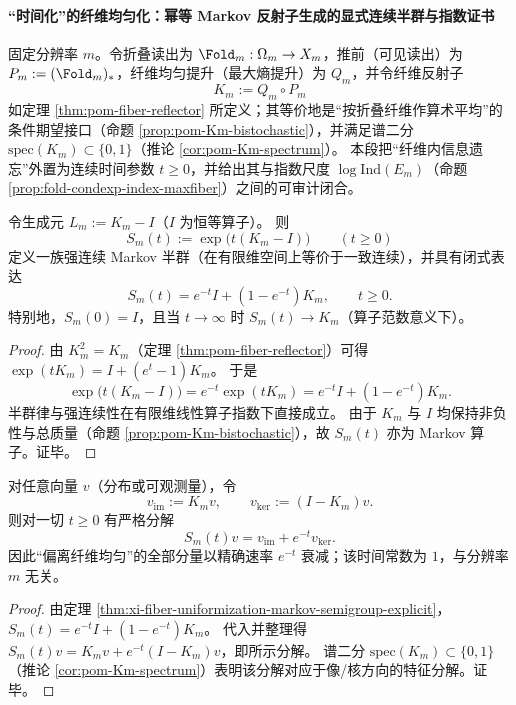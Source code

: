 \paragraph{“时间化”的纤维均匀化：幂等 Markov 反射子生成的显式连续半群与指数证书}
固定分辨率 \(m\)。令折叠读出为 \(\Fold_m:\Omega_m\to X_m\)，推前（可见读出）为 \(P_m:=(\Fold_m)_\ast\)，纤维均匀提升（最大熵提升）为 \(Q_m\)，并令纤维反射子
\[
K_m:=Q_m\circ P_m
\]
如定理 \ref{thm:pom-fiber-reflector} 所定义；其等价地是“按折叠纤维作算术平均”的条件期望接口（命题 \ref{prop:pom-Km-bistochastic}），并满足谱二分 \(\mathrm{spec}(K_m)\subset\{0,1\}\)（推论 \ref{cor:pom-Km-spectrum}）。
本段把“纤维内信息遗忘”外置为连续时间参数 \(t\ge 0\)，并给出其与指数尺度 \(\log\mathrm{Ind}(E_m)\)（命题 \ref{prop:fold-condexp-index-maxfiber}）之间的可审计闭合。
\par

\begin{theorem}[纤维均匀化的显式连续时间半群]\label{thm:xi-fiber-uniformization-markov-semigroup-explicit}
令生成元 \(L_m:=K_m-I\)（\(I\) 为恒等算子）。
则
\[
S_m(t):=\exp\!\bigl(t(K_m-I)\bigr)\qquad (t\ge 0)
\]
定义一族强连续 Markov 半群（在有限维空间上等价于一致连续），并具有闭式表达
\[
\boxed{\;
S_m(t)=e^{-t}I+(1-e^{-t})K_m,\qquad t\ge 0.
\;}
\]
特别地，\(S_m(0)=I\)，且当 \(t\to\infty\) 时 \(S_m(t)\to K_m\)（算子范数意义下）。
\end{theorem}
\begin{proof}
由 \(K_m^2=K_m\)（定理 \ref{thm:pom-fiber-reflector}）可得
\(
\exp(tK_m)=I+(e^{t}-1)K_m
\)。
于是
\[
\exp\!\bigl(t(K_m-I)\bigr)
=e^{-t}\exp(tK_m)
=e^{-t}I+(1-e^{-t})K_m.
\]
半群律与强连续性在有限维线性算子指数下直接成立。
由于 \(K_m\) 与 \(I\) 均保持非负性与总质量（命题 \ref{prop:pom-Km-bistochastic}），故 \(S_m(t)\) 亦为 Markov 算子。证毕。
\end{proof}

\begin{proposition}[谱二分给出的精确收敛率与分辨率无关的时间常数]\label{prop:xi-fiber-uniformization-spectral-decay-equals-exp}
对任意向量 \(v\)（分布或可观测量），令
\[
v_{\mathrm{im}}:=K_m v,\qquad v_{\ker}:=(I-K_m)v.
\]
则对一切 \(t\ge 0\) 有严格分解
\[
\boxed{\;
S_m(t)v=v_{\mathrm{im}}+e^{-t}v_{\ker}.
\;}
\]
因此“偏离纤维均匀”的全部分量以精确速率 \(e^{-t}\) 衰减；该时间常数为 \(1\)，与分辨率 \(m\) 无关。
\end{proposition}
\begin{proof}
由定理 \ref{thm:xi-fiber-uniformization-markov-semigroup-explicit}，
\(
S_m(t)=e^{-t}I+(1-e^{-t})K_m
\)。
代入并整理得
\(
S_m(t)v=K_mv+e^{-t}(I-K_m)v
\)，即所示分解。
谱二分 \(\mathrm{spec}(K_m)\subset\{0,1\}\)（推论 \ref{cor:pom-Km-spectrum}）表明该分解对应于像/核方向的特征分解。证毕。
\end{proof}

